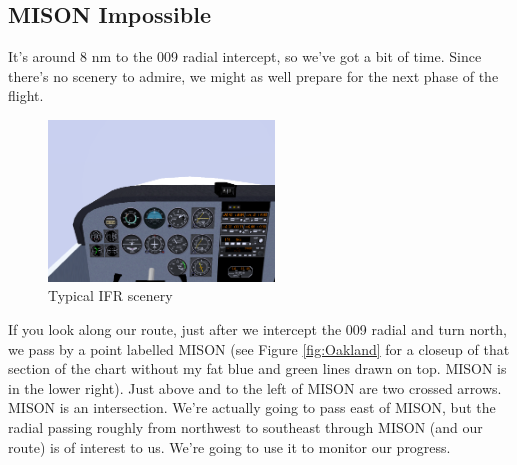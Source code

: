 \subsection{MISON Impossible}

It's around 8 nm to the 009 radial intercept, so we've got a bit of
time.  Since there's no scenery to admire, we might as well prepare
for the next phase of the flight.

\begin{figure}
  \begin{center}
    \includegraphics[width=6cm]{img/murk}
    \caption{Typical IFR scenery}
    \label{fig:murk}
  \end{center}
\end{figure}

If you look along our route, just after we intercept the 009 radial
and turn north, we pass by a point labelled MISON (see Figure
\ref{fig:Oakland} for a closeup of that section of the chart without
my fat blue and green lines drawn on top.  MISON is in the lower
right).  Just above and to the left of MISON are two crossed arrows.
MISON is an intersection.  We're actually going to pass east of MISON,
but the radial passing roughly from northwest to southeast through
MISON (and our route) is of interest to us.  We're going to use it to
monitor our progress.

